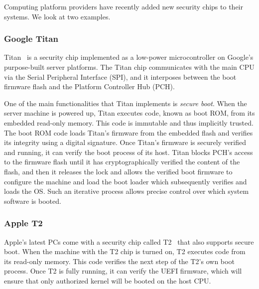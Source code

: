 \documentclass[letterpaper,twocolumn,10pt]{article}
\begin{document}
Computing platform providers have recently added new security chips to their systems. We look at two examples.


\subsubsection*{Google Titan}

Titan~\cite{titan} is a security chip implemented as a low-power microcontroller on Google's purpose-built server platforms. The Titan chip communicates with the main CPU via the Serial Peripheral Interface (SPI), and it interposes between the boot firmware flash and the Platform Controller Hub (PCH).

 One of the main functionalities that Titan implements is \emph{secure boot}. When the server machine is powered up, Titan executes code, known as boot ROM, from its embedded read-only memory. This code is immutable and thus implicitly trusted. The boot ROM code loads Titan's firmware from the embedded flash and verifies its integrity using a digital signature. Once Titan's firmware is securely verified and running, it can verify the boot process of its host. Titan blocks PCH's access to the firmware flash until it has cryptographically verified the content of the flash, and then it releases the lock and allows the verified boot firmware to configure the machine and load the boot loader which subsequently verifies and loads the OS. Such an iterative process allows precise control over which system software is booted. 

%

 
\subsubsection*{Apple T2}
 
Apple's latest PCs come with a security chip called T2~\cite{t2} that also supports secure boot. When the machine with the T2 chip is turned on, T2 executes code from its read-only memory. This code verifies the next step of the T2's own boot process. Once T2 is fully running, it can verify the UEFI firmware, which will ensure that only authorized kernel will be booted on the host CPU.
\end{document}
